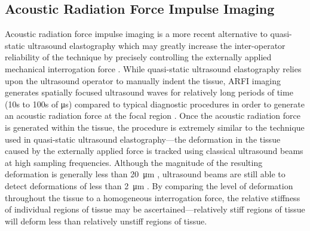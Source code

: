 		\subsection{Acoustic Radiation Force Impulse Imaging}
			Acoustic radiation force impulse imaging is a more recent alternative to quasi-static ultrasound elastography which may greatly increase the inter-operator reliability of the technique by precisely controlling the externally applied mechanical interrogation force \cite{nightingale00-1,nightingale01}. While quasi-static ultrasound elastography relies upon the ultrasound operator to manually indent the tissue, ARFI imaging generates spatially focused ultrasound waves for relatively long periods of time (10s to 100s of \si{\micro\second}) compared to typical diagnostic procedures in order to generate an acoustic radiation force at the focal region \cite{nightingale02,nightingale02-7,palmeri05}. Once the acoustic radiation force is generated within the tissue, the procedure is extremely similar to the technique used in quasi-static ultrasound elastography---the deformation in the tissue caused by the externally applied force is tracked using classical ultrasound beams at high sampling frequencies. Although the magnitude of the resulting deformation is generally less than \SI{20}{\um} \cite{nightingale02}, ultrasound beams are still able to detect deformations of less than \SI{2}{\um} \cite{SiemensVirtualTouch,pinton06}. By comparing the level of deformation throughout the tissue to a homogeneous interrogation force, the relative stiffness of individual regions of tissue may be ascertained---relatively stiff regions of tissue will deform less than relatively unstiff regions of tissue.

